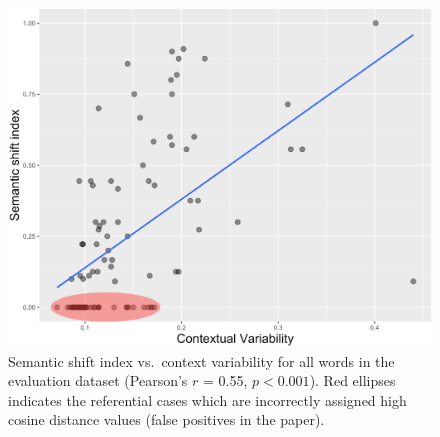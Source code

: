 \begin{figure}[t]\centering
\includegraphics[width=\columnwidth]{images/contextual_variability_shift_index_annotated.png}
\caption{Semantic shift index vs.~context variability for all words in the evaluation dataset (Pearson's $r$ = 0.55, $p< 0.001$). Red ellipses indicates the referential cases which are incorrectly assigned high cosine distance values (false positives in the paper).
\label{fig:shift-variability}}
\end{figure}


